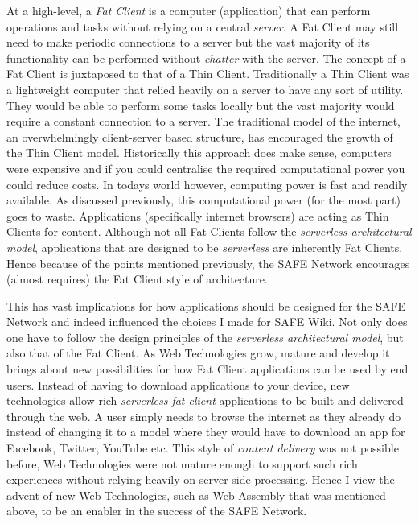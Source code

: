 \documentclass{l4proj}
\begin{document}
At a high-level, a \textit{Fat Client} is a computer (application) that can perform operations and tasks without relying on a central \textit{server}. A Fat Client may still need to make periodic connections to a server but the vast majority of its functionality can be performed without \textit{chatter} with the server. The concept of a Fat Client is juxtaposed to that of a Thin Client. Traditionally a Thin Client was a lightweight computer that relied heavily on a server to have any sort of utility. They would be able to perform some tasks locally but the vast majority would require a constant connection to a server. The traditional model of the internet, an overwhelmingly client-server based structure, has encouraged the growth of the Thin Client model. Historically this approach does make sense, computers were expensive and if you could centralise the required computational power you could reduce costs. In todays world however, computing power is fast and readily available. As discussed previously, this computational power (for the most part) goes to waste. Applications (specifically internet browsers) are acting as Thin Clients for content. Although not all Fat Clients follow the \textit{serverless architectural model}, applications that are designed to be \textit{serverless} are inherently Fat Clients. Hence because of the points mentioned previously, the SAFE Network encourages (almost requires) the Fat Client style of architecture.

This has vast implications for how applications should be designed for the SAFE Network and indeed influenced the choices I made for SAFE Wiki. Not only does one have to follow the design principles of the \textit{serverless architectural model}, but also that of the Fat Client. As Web Technologies grow, mature and develop it brings about new possibilities for how Fat Client applications can be used by end users. Instead of having to download applications to your device, new technologies allow rich \textit{serverless fat client} applications to be built and delivered through the web. A user simply needs to browse the internet as they already do instead of changing it to a model where they would have to download an app for Facebook, Twitter, YouTube etc. This style of \textit{content delivery} was not possible before, Web Technologies were not mature enough to support such rich experiences without relying heavily on server side processing. Hence I view the advent of new Web Technologies, such as Web Assembly that was mentioned above, to be an enabler in the success of the SAFE Network.
\end{document}
